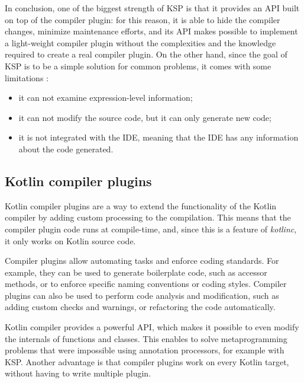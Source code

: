 In conclusion, one of the biggest strength of KSP is that it provides an API built on top of the compiler plugin: for this reason, it is able to hide the compiler changes, minimize maintenance efforts, and its API makes possible to implement a light-weight compiler plugin without the complexities and the knowledge required to create a real compiler plugin.\newline
On the other hand, since the goal of KSP is to be a simple solution for common problems, it comes with some limitations \cite{ksp_limitations}:
\begin{itemize}
    \item it can not examine expression-level information;
    \item it can not modify the source code, but it can only generate new code;
    \item it is not integrated with the IDE, meaning that the IDE has any information about the code generated.
\end{itemize}

\subsection{Kotlin compiler plugins}
Kotlin compiler plugins \cite{compiler_plugins_jetbrains} are a way to extend the functionality of the Kotlin compiler by adding custom processing to the compilation. This means that the compiler plugin code runs at compile-time, and, since this is a feature of \textit{kotlinc}, it only works on Kotlin source code.

Compiler plugins allow automating tasks and enforce coding standards. For example, they can be used to generate boilerplate code, such as accessor methods, or to enforce specific naming conventions or coding styles. Compiler plugins can also be used to perform code analysis and modification, such as adding custom checks and warnings, or refactoring the code automatically.

Kotlin compiler provides a powerful API, which makes it possible to even modify the internals of functions and classes. This enables to solve metaprogramming problems that were impossible using annotation processors, for example with KSP. Another advantage is that compiler plugins work on every Kotlin target, without having to write multiple plugin.

